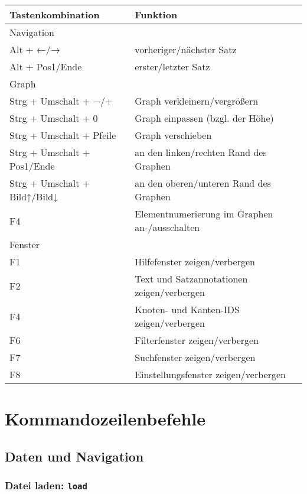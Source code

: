 \documentclass[12pt]{scrartcl}
\begin{document}
\begin{center}
	\begin{tabular*}{\textwidth}{ll}
		\toprule
		Tastenkombination & Funktion \\
		\midrule
		Navigation & \\
		\midrule
			Alt + ←/→ & vorheriger/nächster Satz \\
			Alt + Pos1/Ende & erster/letzter Satz \\
		\midrule
		Graph & \\
		\midrule
			Strg + Umschalt + −/+ & Graph verkleinern/vergrößern \\
			Strg + Umschalt + 0 & Graph einpassen (bzgl. der Höhe) \\
			Strg + Umschalt + Pfeile & Graph verschieben \\
			Strg + Umschalt + Pos1/Ende & an den linken/rechten Rand des Graphen \\
			Strg + Umschalt + Bild↑/Bild↓ & an den oberen/unteren Rand des Graphen \\
			F4 & Elementnumerierung im Graphen an-/ausschalten\\
		\midrule
		Fenster & \\
		\midrule
			F1 & Hilfefenster zeigen/verbergen\\
			F2 & Text und Satzannotationen zeigen/verbergen\\
			F4 & Knoten- und Kanten-IDS zeigen/verbergen\\
			F6 & Filterfenster zeigen/verbergen\\
			F7 & Suchfenster zeigen/verbergen\\
			F8 & Einstellungsfenster zeigen/verbergen\\
		\bottomrule
	\end{tabular*}
\end{center}





\section{Kommandozeilenbefehle}

\subsection{Daten und Navigation}

\subsubsection{Datei laden: \texttt{load}}
\end{document}

